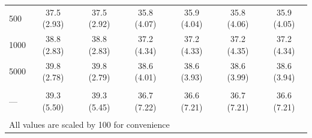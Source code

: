 \documentclass[AMA,STIX1COL,doublespace]{WileyNJD-v2}
\begin{document}
\begin{table}
\begin{tabular}[t]{lcccccc}
\hspace{1em}500 & 37.5 (2.93) & 37.5 (2.92) & 35.8 (4.07) & 35.9 (4.04) & 35.8 (4.06) & 35.9 (4.05)\\
\hspace{1em}1000 & 38.8 (2.83) & 38.8 (2.83) & 37.2 (4.34) & 37.2 (4.33) & 37.2 (4.35) & 37.2 (4.34)\\
\hspace{1em}5000 & 39.8 (2.78) & 39.8 (2.79) & 38.6 (4.01) & 38.6 (3.93) & 38.6 (3.99) & 38.6 (3.94)\\
\addlinespace[0.75em]
\multicolumn{7}{l}{\textbf{Overall}}\\
\hline
\hspace{1em}--- & 39.3 (5.50) & 39.3 (5.45) & 36.7 (7.22) & 36.6 (7.21) & 36.7 (7.21) & 36.6 (7.21)\\
\bottomrule
\multicolumn{7}{l}{\textsuperscript{} All values are scaled by 100 for convenience}\\
\end{tabular}
\end{table}
\end{document}
